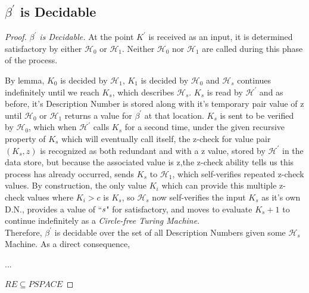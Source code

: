 \documentclass[11pt]{article}
\begin{document}
\subsection{$\beta^{'}$ is Decidable}
\begin{proof}

 \emph{$\beta^{'}$ is Decidable.} At the point $K^{'}$ is received as an input, it is determined satisfactory by either $\mathscr{H}_0$ or $\mathscr{H}_1$. Neither $\mathscr{H}_0$ nor $\mathscr{H}_1$ are called during this phase of the process.
 
 By lemma, $K_0$ is decided by $\mathscr{H}_1$, $K_1$ is decided by $\mathscr{H}_0$ and $\mathscr{H}_s$  continues indefinitely until we reach $K_s$, which describes $\mathscr{H}_s$. $K_s$ is read by $\mathscr{H}^{'}$ and as before, it's Description Number is stored along with it's temporary pair value of z until $\mathscr{H}_0$ or $\mathscr{H}_1$ returns a value for $\beta^{'}$ at that location. $K_s$ is sent to be verified by $\mathscr{H}_0$, which when $\mathscr{H}^{'}$ calls $K_s$ for a second time, under the given recursive property of $K_s$ which will eventually call itself, the z-check for value pair $(K_s, z)$ is recognized as both redundant and with a z value, stored by $\mathscr{H}^{'}$ in the data store, but because the associated value is z,the z-check ability tells us this process has already occurred, sends $K_s$ to $\mathscr{H}_1$, which self-verifies repeated z-check values. By construction, the only value $K_i$ which can provide this multiple z-check values where $K_i > c$ is $K_s$, so $\mathscr{H}_s$ now self-verifies the input $K_s$ as it's own D.N., provides a value of ``$\emph{s}$" for satisfactory, %
 and moves to evaluate $K_s + 1$ to continue indefinitely as a \emph{Circle-free Turing Machine}. 
\\

Therefore, $\beta^{'}$ is decidable over the set of all Description Numbers given some $\mathscr{H}_s$ Machine. As a direct consequence,

...

$RE\subseteq PSPACE$ 
\end{proof}

\end{document}
